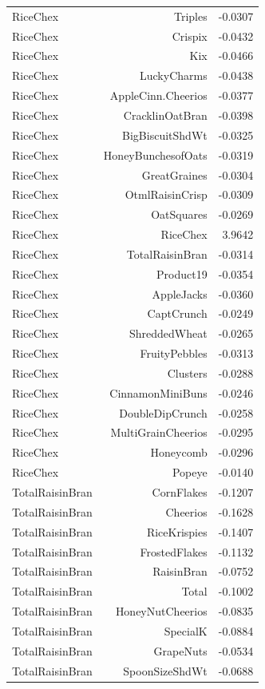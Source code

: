 \begin{longtable}{@{}lrr@{}}
RiceChex & Triples & -0.0307 \\
RiceChex & Crispix & -0.0432 \\
RiceChex & Kix & -0.0466 \\
RiceChex & LuckyCharms & -0.0438 \\
RiceChex & AppleCinn.Cheerios & -0.0377 \\
RiceChex & CracklinOatBran & -0.0398 \\
RiceChex & BigBiscuitShdWt & -0.0325 \\
RiceChex & HoneyBunchesofOats & -0.0319 \\
RiceChex & GreatGraines & -0.0304 \\
RiceChex & OtmlRaisinCrisp & -0.0309 \\
RiceChex & OatSquares & -0.0269 \\
RiceChex & RiceChex & 3.9642 \\
RiceChex & TotalRaisinBran & -0.0314 \\
RiceChex & Product19 & -0.0354 \\
RiceChex & AppleJacks & -0.0360 \\
RiceChex & CaptCrunch & -0.0249 \\
RiceChex & ShreddedWheat & -0.0265 \\
RiceChex & FruityPebbles & -0.0313 \\
RiceChex & Clusters & -0.0288 \\
RiceChex & CinnamonMiniBuns & -0.0246 \\
RiceChex & DoubleDipCrunch & -0.0258 \\
RiceChex & MultiGrainCheerios & -0.0295 \\
RiceChex & Honeycomb & -0.0296 \\
RiceChex & Popeye & -0.0140 \\
TotalRaisinBran & CornFlakes & -0.1207 \\
TotalRaisinBran & Cheerios & -0.1628 \\
TotalRaisinBran & RiceKrispies & -0.1407 \\
TotalRaisinBran & FrostedFlakes & -0.1132 \\
TotalRaisinBran & RaisinBran & -0.0752 \\
TotalRaisinBran & Total & -0.1002 \\
TotalRaisinBran & HoneyNutCheerios & -0.0835 \\
TotalRaisinBran & SpecialK & -0.0884 \\
TotalRaisinBran & GrapeNuts & -0.0534 \\
TotalRaisinBran & SpoonSizeShdWt & -0.0688 \\

\end{longtable}
